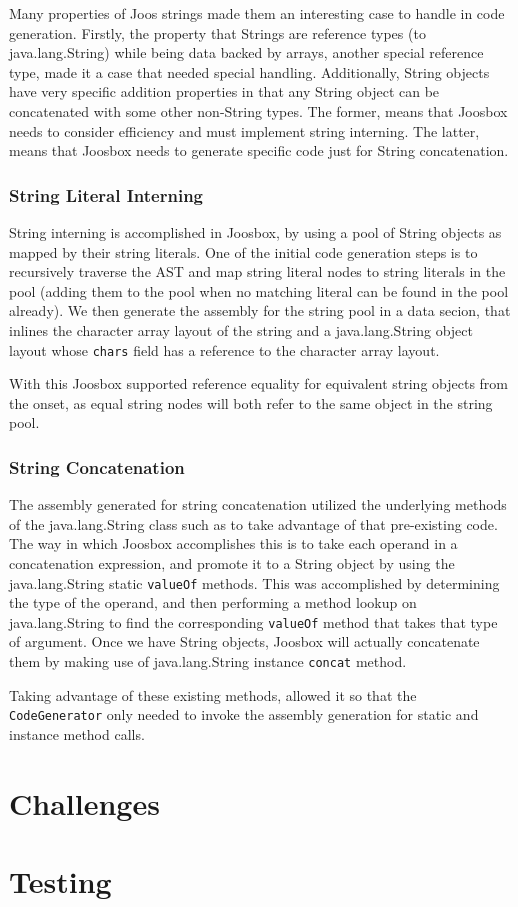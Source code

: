 \documentclass[letterpaper]{article}
\begin{document}
  Many properties of Joos strings made them an interesting case to handle in
  code generation. Firstly, the property that Strings are reference types (to
  java.lang.String) while being data backed by arrays, another special reference
  type, made it a case that needed special handling. Additionally, String
  objects have very specific addition properties in that any String object can
  be concatenated with some other non-String types. The former, means that
  Joosbox needs to consider efficiency and must implement string interning. The
  latter, means that Joosbox needs to generate specific code just for String
  concatenation.

  \subsubsection{String Literal Interning}

  String interning is accomplished in Joosbox, by using a pool of String objects
  as mapped by their string literals. One of the initial code generation steps
  is to recursively traverse the AST and map string literal nodes to string
  literals in the pool (adding them to the pool when no matching literal can be
  found in the pool already). We then generate the assembly for the string pool
  in a data secion, that inlines the character array layout of the string and a
  java.lang.String object layout whose {\tt chars} field has a reference to the
  character array layout.

  With this Joosbox supported reference equality for equivalent string objects
  from the onset, as equal string nodes will both refer to the same object in
  the string pool.

  \subsubsection{String Concatenation}

  The assembly generated for string concatenation utilized the underlying
  methods of the java.lang.String class such as to take advantage of that
  pre-existing code. The way in which Joosbox accomplishes this is to take each
  operand in a concatenation expression, and promote it to a String object by
  using the java.lang.String static {\tt valueOf} methods. This was accomplished
  by determining the type of the operand, and then performing a method lookup on
  java.lang.String to find the corresponding {\tt valueOf} method that takes
  that type of argument. Once we have String objects, Joosbox will actually
  concatenate them by making use of java.lang.String instance {\tt concat}
  method.

  Taking advantage of these existing methods, allowed it so that the {\tt
  CodeGenerator} only needed to invoke the assembly generation for static and
  instance method calls.

  \section{Challenges}


  \section{Testing}
\end{document}
